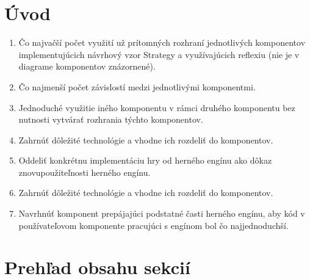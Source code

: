 \documentclass[11pt,slovak,a4paper,twoside]{article}
\begin{document}
\section{Úvod} \label{in}



\begin{enumerate}

	\item \v{C}o najva\v{c}\v{s}í po\v{c}et vyu\v{z}ití u\v{z} prítomných rozhraní jednotlivých komponentov implementujúcich návrhový vzor Strategy a vyu\v{z}ívajúcich reflexiu (nie je v diagrame komponentov znázornené).

	\item \v{C}o najmen\v{s}í po\v{c}et závislostí medzi jednotlivými komponentmi.

	\item Jednoduché vyu\v{z}itie iného komponentu v rámci druhého komponentu bez nutnosti vytvára\v{t} rozhrania týchto komponentov.
	
	\item Zahrnú\v{t} dôle\v{z}ité technológie a vhodne ich rozdeli\v{t} do komponentov. 
	
	\item Oddeli\v{t} konkrétnu implementáciu hry od herného engínu ako dôkaz znovupou\v{z}ite\v{l}nosti herného engínu. 
	
	\item Zahrnú\v{t} dôle\v{z}ité technológie a vhodne ich rozdeli\v{t} do komponentov. 
	
	\item Navrhnú\v{t} komponent prepájajúci podstatné \v{c}asti herného engínu, aby kód v pou\v{z}ívate\v{l}ovom komponente pracujúci s engínom bol \v{c}o naj\-jednoduch\v{s}í.
	
\end{enumerate}
  

\section{Preh\v{l}ad obsahu sekcií} \label{content}
\end{document}
